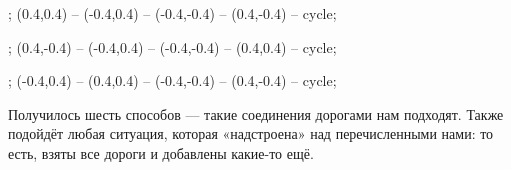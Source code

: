 \begin{itemize}
\begin{center}
{\begin{scope}[xshift=-2.2cm,yshift=-1.5cm]
	\cities;
	\dwt (0.4,0.4) -- (-0.4,0.4) -- (-0.4,-0.4) -- (0.4,-0.4) -- cycle;
\end{scope}

\begin{scope}[xshift=0cm,yshift=-1.5cm]
	\cities;
	\dwt (0.4,-0.4) -- (-0.4,0.4) -- (-0.4,-0.4) -- (0.4,0.4) -- cycle;
\end{scope}

\begin{scope}[xshift=2.2cm,yshift=-1.5cm]
	\cities;
	\dwt (-0.4,0.4) -- (0.4,0.4) -- (-0.4,-0.4) -- (0.4,-0.4) -- cycle;
\end{scope}

}\end{center}

Получилось шесть способов — такие соединения дорогами нам подходят. Также подойдёт любая ситуация, которая «надстроена» над перечисленными нами: то есть, взяты все дороги и добавлены какие-то ещё.
\end{itemize}
